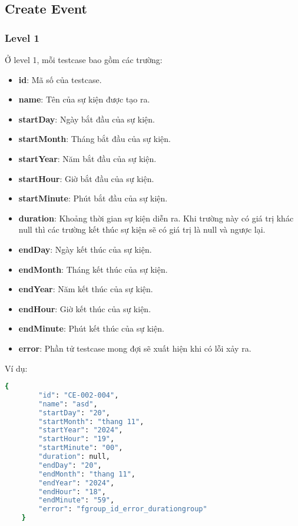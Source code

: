 \subsection{Create Event}
\subsubsection{Level 1}
Ở level 1, mỗi testcase bao gồm các trường:
\begin{itemize}
    \item \textbf{id}: Mã số của testcase.
    \item \textbf{name}: Tên của sự kiện được tạo ra.
    \item \textbf{startDay}: Ngày bắt đầu của sự kiện.
    \item \textbf{startMonth}: Tháng bắt đầu của sự kiện.
    \item \textbf{startYear}: Năm bắt đầu của sự kiện.
    \item \textbf{startHour}: Giờ bắt đầu của sự kiện.
    \item \textbf{startMinute}: Phút bắt đầu của sự kiện.
    \item \textbf{duration}: Khoảng thời gian sự kiện diễn ra. Khi trường này có giá trị khác null thì các trường kết thúc sự kiện sẽ có giá trị là null và ngược lại.
    \item \textbf{endDay}: Ngày kết thúc của sự kiện.
    \item \textbf{endMonth}: Tháng kết thúc của sự kiện.
    \item \textbf{endYear}: Năm kết thúc của sự kiện.
    \item \textbf{endHour}: Giờ kết thúc của sự kiện.
    \item \textbf{endMinute}: Phút kết thúc của sự kiện.
    \item \textbf{error}: Phần tử testcase mong đợi sẽ xuất hiện khi có lỗi xảy ra.
\end{itemize}

Ví dụ:
\begin{lstlisting}[language=bash, caption={Ví dụ testcase CE-002-004 ở level 1}, breaklines=true]
    {
        "id": "CE-002-004",
        "name": "asd",
        "startDay": "20",
        "startMonth": "thang 11",
        "startYear": "2024",
        "startHour": "19",
        "startMinute": "00",
        "duration": null,
        "endDay": "20",
        "endMonth": "thang 11",
        "endYear": "2024",
        "endHour": "18",
        "endMinute": "59",
        "error": "fgroup_id_error_durationgroup"
    }
\end{lstlisting}

